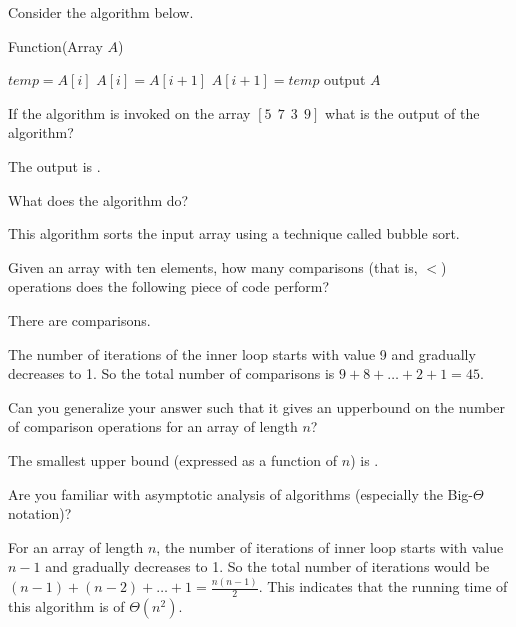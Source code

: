 \begin{question}
Consider the algorithm below.
\begin{algorithm}
\caption{Function(Array $A$)}
\begin{algorithmic}
  \STATE $temp = A[i]$
  \STATE $A[i] = A[i+1]$
  \STATE $A[i+1] = temp$
  \ENDIF
  \ENDFOR
  \ENDFOR
  \STATE output $A$
\end{algorithmic}
\end{algorithm}

If the algorithm is invoked on the array $[ 5~~ 7~~ 3~~ 9]$ what is the output of the algorithm?
\begin{solution}
The output is .
\end{solution}

What does the algorithm do? 
\begin{free-response}
\end{free-response}
This algorithm sorts the input array using a technique called bubble sort.

Given an array with ten elements, how many comparisons (that is, $<$) operations does the following piece of code perform?
\begin{solution}
There are  comparisons.
\end{solution}  
The number of iterations of the inner loop starts with value 9 and gradually decreases to 1. So the total number of comparisons is $ 9 + 8 + \ldots + 2 + 1 = 45$.

Can you generalize your answer such that it gives an upperbound on the number of comparison operations for an array of length $n$?
\begin{solution}
The smallest upper bound (expressed as a function of $n$) is .
\end{solution}
\begin{hint}
Are you familiar with asymptotic analysis of algorithms (especially the Big-$\Theta$ notation)? 
\end{hint}
For an array of length $n$, the number of iterations of inner loop starts with value $n-1$ and gradually decreases to 1. So the total number of iterations would be $(n-1) + (n-2) + \ldots + 1 = \frac{n(n-1)}{2}$. This indicates that the running time of this algorithm is of $\Theta(n^2)$.
\end{question}

